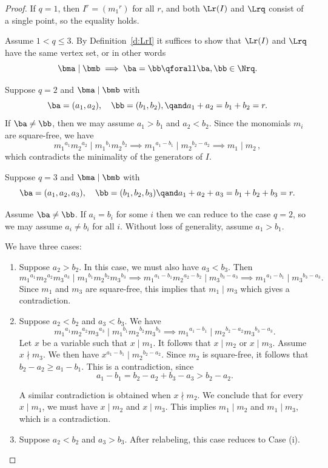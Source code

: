 \begin{proof} If $q=1$, then $I^r=({m_1}^r)$ for all $r$, and both
  $\Lr(I)$ and $\Lrq$ consist of a single point, so the equality holds.

 Assume $1< q \le 3$. By Definition~\ref{d:LrI} it suffices to show that
 $\Lr(I)$ and $\Lrq$ have the same vertex set, or in other
 words
   $$\bma \mid \bmb \implies  \ba=\bb \qforall \ba,\bb\in \Nrq.$$
 
  Suppose $q=2$ and $\bma \mid \bmb$ with
 $$\ba = (a_1,a_2), \quad \bb=(b_1,b_2), \qand a_1+a_2=b_1+b_2=r.$$ If
  $\ba\ne \bb$, then we may assume $a_1>b_1$ and $a_2<b_2$.  Since the
  monomials $m_i$ are square-free, we have
 $${m_1}^{a_1}{m_2}^{a_2} \mid {m_1}^{b_1}{m_2}^{b_2}\implies {m_1}^{a_1-b_1}
 \mid {m_2}^{b_2-a_2}\implies m_1\mid m_2\,,$$
which  contradicts the
 minimality of the generators of $I$.
 
Suppose $q=3$ and $\bma \mid \bmb$ with $$\ba
=(a_1,a_2,a_3),\quad \bb = (b_1,b_2,b_3) \qand
a_1+a_2+a_3=b_1+b_2+b_3=r.$$ 

Assume $\ba\ne \bb$.  If $a_i=b_i$ for some $i$ then we can reduce to
the case $q=2$, so we may assume $a_i\ne b_i$ for all $i$. Without
loss of generality, assume $a_1>b_1$.

We have three cases:

  \begin{enumerate}[label=\textup{(}\roman*\textup{)}]
 \item Suppose $a_2 >b_2$. In this case, we must also have
   $a_3<b_3$. Then {\small $$ {m_1}^{a_1}{m_2}^{a_2}{m_3}^{a_3} \mid
   {m_1}^{b_1}{m_2}^{b_2}{m_3}^{b_3}\implies {m_1}^{a_1-b_1}{m_2}^{a_2-b_2} \mid
   {m_3}^{b_3-a_3}\implies {m_1}^{a_1-b_1} \mid {m_3}^{b_3-a_3}.$$} Since
   $m_1$ and $m_3$ are square-free, this implies that $m_1\mid m_3$
   which gives a
   contradiction. 

\item Suppose $a_2 < b_2$ and
  $a_3 < b_3$.  We have  
   $${m_1}^{a_1}{m_2}^{a_2}{m_3}^{a_3} \mid
  {m_1}^{b_1}{m_2}^{b_2}{m_3}^{b_3}\implies {m_1}^{a_1-b_1} \mid
  {m_2}^{b_2-a_2}{m_3}^{b_3-a_3}.$$ Let $x$ be a variable such that $x
  \mid m_1$. It follows that $x\mid m_2$ or $x\mid m_3$. Assume
  $x\nmid m_3$.  We then have $x^{a_1-b_1}\mid {m_2}^{b_2-a_2}$. Since
  $m_2$ is square-free, it follows that $b_2-a_2\ge
  a_1-b_1$. This is a contradiction, since
$$a_1-b_1=b_2-a_2+b_3-a_3>b_2-a_2.$$

 A similar contradiction is obtained when $x\nmid m_2$. We conclude
 that for every $x \mid m_1$, we must have $x\mid m_2$ and $x\mid
 m_3$. This implies $m_1 \mid m_2$ and $m_1\mid m_3$,
 which is a contradiction.
 
\item Suppose $a_2<b_2$ and $a_3>b_3$. After relabeling, this case reduces
  to Case (i).
\end{enumerate}
\end{proof}


